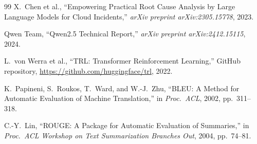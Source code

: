 \documentclass[conference]{IEEEtran}
\begin{document}
\begin{thebibliography}{99}
X.\ Chen et al., ``Empowering Practical Root Cause Analysis by Large Language Models for Cloud Incidents,'' \textit{arXiv preprint arXiv:2305.15778}, 2023.

Qwen Team, ``Qwen2.5 Technical Report,'' \textit{arXiv preprint arXiv:2412.15115}, 2024.

L.\ von Werra et al., ``TRL: Transformer Reinforcement Learning,'' GitHub repository, \url{https://github.com/huggingface/trl}, 2022.

K.\ Papineni, S.\ Roukos, T.\ Ward, and W.-J.\ Zhu, ``BLEU: A Method for Automatic Evaluation of Machine Translation,'' in \textit{Proc.\ ACL}, 2002, pp.\ 311--318.

C.-Y.\ Lin, ``ROUGE: A Package for Automatic Evaluation of Summaries,'' in \textit{Proc.\ ACL Workshop on Text Summarization Branches Out}, 2004, pp.\ 74--81.

\end{thebibliography}
\end{document}
